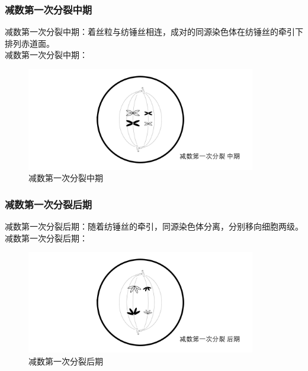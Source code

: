 \documentclass[UTF8]{ctexart}
\begin{document}
\subsubsection{减数第一次分裂中期}
    减数第一次分裂中期：着丝粒与纺锤丝相连，成对的同源染色体在纺锤丝的牵引下排列赤道面。\\[4mm]
    减数第一次分裂中期：
    \begin{figure}[h]
        \begin{center}
            \includegraphics[width=10cm]{BiologyImage/36.jpg}
            \caption{减数第一次分裂中期}
        \end{center}
    \end{figure}

\subsubsection{减数第一次分裂后期}
    减数第一次分裂后期：随着纺锤丝的牵引，同源染色体分离，分别移向细胞两级。\\[4mm]
    减数第一次分裂后期：
    \begin{figure}[h]
        \begin{center}
            \includegraphics[width=10cm]{BiologyImage/37.jpg}
            \caption{减数第一次分裂后期}
        \end{center}
    \end{figure}

\newpage
\end{document}
